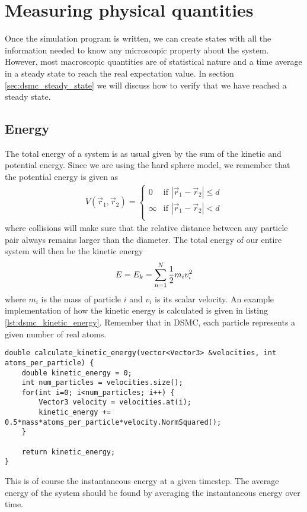 \section{Measuring physical quantities}
\label{sec:dsmc_measuring_physical_quantities}
Once the simulation program is written, we can create states with all the information needed to know any microscopic property about the system. However, most macroscopic quantities are of statistical nature and 
 a time average in a steady state to reach the real expectation value. In section \ref{sec:dsmc_steady_state} we will discuss how to verify that we have reached a steady state. 
\subsection{Energy}
The total energy of a system is as usual given by the sum of the kinetic and potential energy. Since we are using the hard sphere model, we remember that the potential energy is given as
\begin{align}
	V(\vec r_1, \vec r_2) = \left\{
	\begin{array}{lr}
	0 & \text{if } |\vec r_1  - \vec r_2| \leq d\\
	\infty & \text{if } |\vec r_1  - \vec r_2| < d\\
	\end{array}
	\right .
\end{align}
where collisions will make sure that the relative distance between any particle pair always remains larger than the diameter. The total energy of our entire system will then be the kinetic energy
\begin{align}
	E = E_k = \sum_{n=1}^N {1\over 2}m_iv_i^2
\end{align}
where $m_i$ is the mass of particle $i$ and $v_i$ is its scalar velocity. An example implementation of how the kinetic energy is calculated is given in listing \ref{lst:dsmc_kinetic_energy}. Remember that in DSMC, each particle represents a given number of real atoms.

\begin{lstlisting}[caption=Calculation of kinetic energy., label=lst:dsmc_kinetic_energy]
double calculate_kinetic_energy(vector<Vector3> &velocities, int atoms_per_particle) {
	double kinetic_energy = 0;
	int num_particles = velocities.size();
	for(int i=0; i<num_particles; i++) {
		Vector3 velocity = velocities.at(i);
		kinetic_energy += 0.5*mass*atoms_per_particle*velocity.NormSquared();
	}

	return kinetic_energy;
}
\end{lstlisting}
This is of course the instantaneous energy at a given timestep. The average energy of the system should be found by averaging the instantaneous energy over time.
